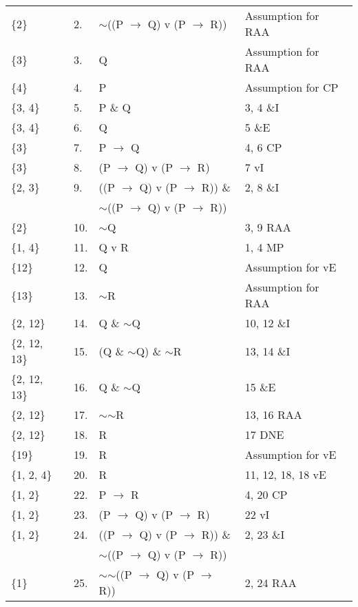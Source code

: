 \documentclass[a4paper,12pt]{article}
\newcommand{\ra}{$\rightarrow$ }
\newcommand{\s}{$\sim$}
\begin{document}
\begin{enumerate}[label=\arabic*,leftmargin=*]
\begin{enumerate}[label=\arabic*.]
\begin{minipage}{\textwidth}
\begin{tabular}{l l l l}
                        \{2\} & 2. & \s ((P \ra Q) v (P \ra R)) & Assumption for RAA\\
                        \{3\} & 3. & Q & Assumption for RAA\\
                        \{4\} & 4. & P &  Assumption for CP\\
                        \{3, 4\} & 5. & P \& Q & 3, 4 \&I\\
                        \{3, 4\} & 6. & Q & 5 \&E\\
                        \{3\} & 7. & P \ra Q & 4, 6 CP\\
                        \{3\} & 8. & (P \ra Q) v (P \ra R) & 7 vI\\
                        \{2, 3\} & 9. & ((P \ra Q) v (P \ra R)) \& & 2, 8 \&I\\
                         & & \s ((P \ra Q) v (P \ra R)) & \\
                        \{2\} & 10. & \s Q & 3, 9 RAA\\
                        \{1, 4\} & 11. & Q v R & 1, 4 MP\\
                        \{12\} & 12. & Q & Assumption for vE\\
                        \{13\} & 13. & \s R & Assumption for RAA\\
                        \{2, 12\} & 14. & Q \& \s Q & 10, 12 \&I\\
                        \{2, 12, 13\} & 15. & (Q \& \s Q) \& \s R & 13, 14 \&I\\
                        \{2, 12, 13\} & 16. & Q \& \s Q & 15 \&E\\
                        \{2, 12\} & 17. & \s \s R & 13, 16 RAA\\
                        \{2, 12\} & 18. & R & 17 DNE\\
                        \{19\} & 19. & R & Assumption for vE\\
                        \{1, 2, 4\} & 20. & R & 11, 12, 18, 18 vE\\
                        \{1, 2\} & 22. & P \ra R & 4, 20 CP\\
                        \{1, 2\} & 23. & (P \ra Q) v (P \ra R) & 22 vI\\
                        \{1, 2\} & 24. & ((P \ra Q) v (P \ra R)) \& & 2, 23 \&I\\
                         & & \s ((P \ra Q) v (P \ra R)) & \\
                        \{1\} & 25. & \s \s ((P \ra Q) v (P \ra R)) & 2, 24 RAA\\

\end{tabular}
\end{minipage}
\end{enumerate}
\end{enumerate}
\end{document}
